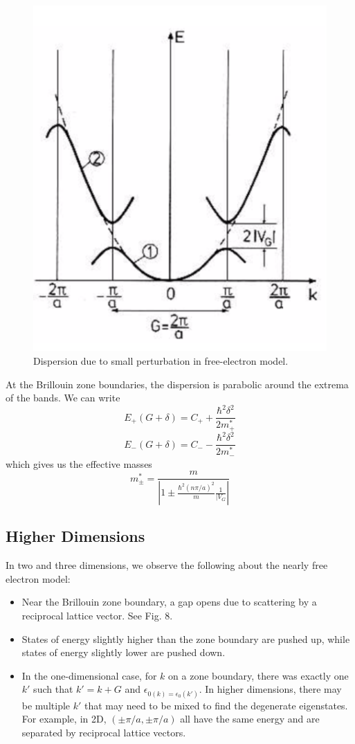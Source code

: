 \documentclass[10pt]{article}
\begin{document}
\begin{figure}
  \centering
    \includegraphics[width=\textwidth]{tb7}
    \caption{Dispersion due to small perturbation in free-electron model.}
\end{figure}
At the Brillouin zone boundaries, the dispersion is parabolic around the extrema of the bands. We can write
$$
E_{+}(G+\delta) = C_{+} + \frac{\hbar^{2}\delta^{2}}{2m^{*}_{+}}
$$
$$
E_{-}(G+\delta) = C_{-} - \frac{\hbar^{2}\delta^{2}}{2m^{*}_{-}}
$$
which gives us the effective masses
$$
m^{*}_{\pm} = \frac{m}{\left |1 \pm \frac{\hbar^{2}(n\pi/a)^{2}}{m}\frac{1}{|V_{G}} \right |}
$$

\subsection{Higher Dimensions}
In two and three dimensions, we observe the following about the nearly free electron model:
\begin{itemize}
  \item Near the Brillouin zone boundary, a gap opens due to scattering by a reciprocal lattice vector. See Fig. 8.
  \item States of energy slightly higher than the zone boundary are pushed up, while states of energy slightly
  lower are pushed down.
  \item In the one-dimensional case, for $k$ on a zone boundary, there was exactly one $k'$ such that $k' = k + G$
  and $\epsilon_{0(k) = \epsilon_{0}(k')}$. In higher dimensions, there may be multiple $k'$ that may need to be mixed
  to find the degenerate eigenstates. For example, in 2D, $(\pm \pi/a, \pm \pi/a)$ all have the same energy and are separated
  by reciprocal lattice vectors.
\end{itemize}
\end{document}
